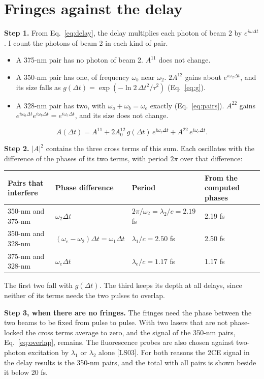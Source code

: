 \documentclass[11pt]{article}
\begin{document}
\section{Fringes against the delay}
\textbf{Step 1.} From Eq.~\ref{eq:delay}, the delay multiplies each photon of beam 2 by $e^{i\omega\Delta t}$. I count the
photons of beam 2 in each kind of pair.
\begin{itemize}
\item A 375-nm pair has no photon of beam 2. $A^{11}$ does not change.
\item A 350-nm pair has one, of frequency $\omega_b$ near $\omega_2$. $2A^{12}$ gains about $e^{i\omega_2\Delta t}$,
and its size falls as $g(\Delta t) = \exp(-\ln 2\,\Delta t^2/\tau^2)$ (Eq.~\ref{eq:g}).
\item A 328-nm pair has two, with $\omega_a + \omega_b = \omega_e$ exactly (Eq.~\ref{eq:pairs}). $A^{22}$ gains
$e^{i\omega_a\Delta t}e^{i\omega_b\Delta t} = e^{i\omega_e\Delta t}$, and its size does not change.
\end{itemize}
\begin{equation}A(\Delta t) = A^{11} + 2A^{12}_0\,g(\Delta t)\,e^{i\omega_2\Delta t} + A^{22}\,e^{i\omega_e\Delta t} .\end{equation}

\textbf{Step 2.} $|A|^2$ contains the three cross terms of this sum. Each oscillates with the difference of the
phases of its two terms, with period $2\pi$ over that difference:
\begin{center}\small\begin{tabular}{llll}\toprule
Pairs that interfere & Phase difference & Period & From the computed phases\\\midrule
350-nm and 375-nm & $\omega_2\Delta t$ & $2\pi/\omega_2 = \lambda_2/c = 2.19$ fs & 2.19 fs\\
350-nm and 328-nm & $(\omega_e - \omega_2)\Delta t = \omega_1\Delta t$ & $\lambda_1/c = 2.50$ fs & 2.50 fs\\
375-nm and 328-nm & $\omega_e\Delta t$ & $\lambda_e/c = 1.17$ fs & 1.17 fs\\\bottomrule\end{tabular}\end{center}
The first two fall with $g(\Delta t)$. The third keeps its depth at all delays, since neither of its terms needs
the two pulses to overlap.

\textbf{Step 3, when there are no fringes.} The fringes need the phase between the two beams to be fixed from
pulse to pulse. With two lasers that are not phase-locked the cross terms average to zero, and the signal of the
350-nm pairs, Eq.~\ref{eq:overlap}, remains. The fluorescence probes are also chosen against two-photon excitation by
$\lambda_1$ or $\lambda_2$ alone [LS03]. For both reasons the 2CE signal in the delay results is the 350-nm pairs,
and the total with all pairs is shown beside it below 20 fs.
\end{document}
